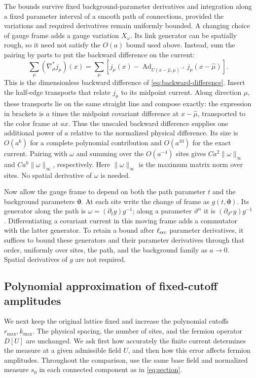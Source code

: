 \documentclass[11pt,a4paper]{article}
\theoremstyle{remark}
\DeclareMathOperator{\Ad}{Ad}
\begin{document}
The bounds survive fixed background-parameter derivatives and
integration along a fixed parameter interval of a smooth path of
connections, provided the variations and required derivatives remain
uniformly bounded. A changing choice of gauge frame adds a gauge
variation $X_\omega$. Its link generator can be spatially rough, so
it need not satisfy the $O(a)$ bound used above. Instead, sum the
pairing by parts to put the backward difference on the current:
\begin{equation}
 \sum_\mu(\nabla_\mu^*j_\mu)(x)
 =\sum_\mu\left[j_\mu(x)
    -\Ad_{U(x-\hat\mu,\mu)^{-1}}j_\mu(x-\hat\mu)\right].
\end{equation}
This is the dimensionless backward difference of
\eqref{eq:backward-difference}. Insert the half-edge transports that
relate $j_\mu$ to its midpoint current. Along direction $\mu$, these
transports lie on the same straight line and compose exactly: the
expression in brackets is $a$ times the midpoint covariant difference
at $x-\hat\mu$, transported to the color frame at $ax$. Thus the
unscaled backward difference supplies one additional power of $a$
relative to the normalized physical difference. Its size is $O(a^6)$
for a complete polynomial contribution and $O(a^{10})$ for the exact current. Pairing with
$\omega$ and summing over the $O(a^{-4})$ sites gives
$Ca^2\|\omega\|_\infty$ and $Ca^6\|\omega\|_\infty$,
respectively. Here $\|\omega\|_\infty$ is the maximum matrix norm
over sites. No spatial derivative of $\omega$ is needed.

Now allow the gauge frame to depend on both the path
parameter $t$ and the background parameters
$\boldsymbol\vartheta$. At each site write the change of frame as
$g(t,\boldsymbol\vartheta)$. Its generator along the path is
$\omega=(\partial_tg)g^{-1}$; along a parameter
$\vartheta^\alpha$ it is
$(\partial_{\vartheta^\alpha}g)g^{-1}$. Differentiating a covariant
current in this moving frame adds a commutator with the latter
generator. To retain a bound after $\ell_{\rm src}$ parameter
derivatives, it suffices to bound these generators and their parameter
derivatives through that order, uniformly over sites, the path, and the
background family as $a\to0$. Spatial derivatives of $g$ are not
required.

\subsection{Polynomial approximation of fixed-cutoff amplitudes}

We next keep the original lattice fixed and increase the polynomial
cutoffs $r_{\max},k_{\max}$. The physical spacing, the number of
sites, and the fermion operator $D[U]$ are unchanged. We ask first
how accurately the finite current determines the measure at a given
admissible field $U$, and then how this error affects fermion
amplitudes. Throughout the comparison, use the same base field and
normalized measure $s_0$ in each connected component as in
\eqref{eq:section}.
\end{document}
